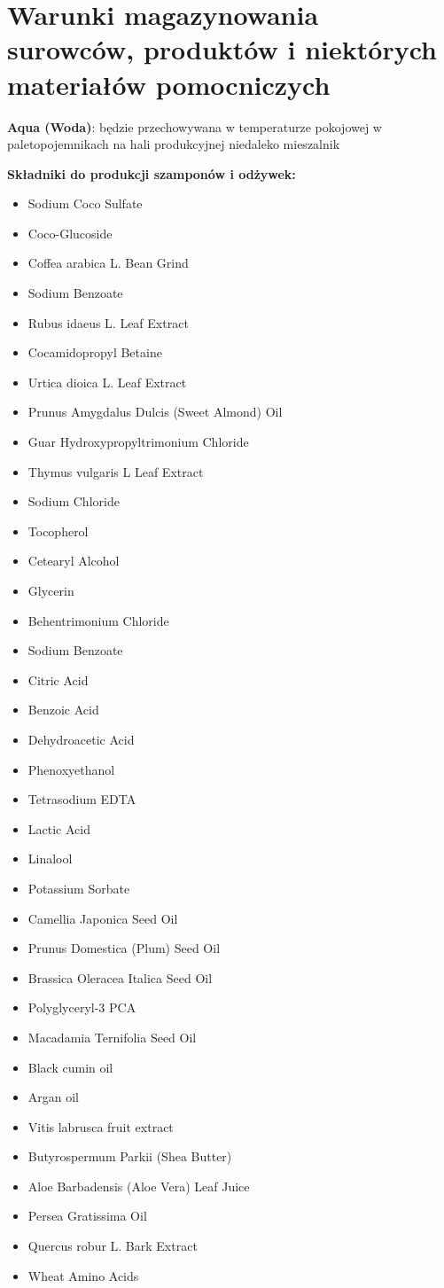 \section{Warunki magazynowania surowców, produktów i niektórych materiałów pomocniczych}

\textbf{Aqua (Woda)}: będzie przechowywana w temperaturze pokojowej w paletopojemnikach na hali produkcyjnej niedaleko mieszalnik\vspace{\baselineskip}

\textbf{Składniki do produkcji szamponów i odżywek:}
\begin{itemize}
	\item Sodium Coco Sulfate
	\item Coco-Glucoside
	\item Coffea arabica L. Bean Grind
	\item Sodium Benzoate
	\item Rubus idaeus L. Leaf Extract
	\item Cocamidopropyl Betaine
	\item Urtica dioica L. Leaf Extract
	\item Prunus Amygdalus Dulcis (Sweet Almond) Oil
	\item Guar Hydroxypropyltrimonium Chloride
	\item Thymus vulgaris L Leaf Extract
	\item Sodium Chloride
	\item Tocopherol
	\item Cetearyl Alcohol
	\item Glycerin
	\item Behentrimonium Chloride
	\item Sodium Benzoate
	\item Citric Acid
	\item Benzoic Acid
	\item Dehydroacetic Acid
	\item Phenoxyethanol
	\item Tetrasodium EDTA
	\item Lactic Acid
	\item Linalool
	\item Potassium Sorbate
	\item Camellia Japonica Seed Oil
	\item Prunus Domestica (Plum) Seed Oil
	\item Brassica Oleracea Italica Seed Oil
	\item Polyglyceryl-3 PCA
	\item Macadamia Ternifolia Seed Oil
	\item Black cumin oil
	\item Argan oil
	\item Vitis labrusca fruit extract
	\item Butyrospermum Parkii (Shea Butter)
	\item Aloe Barbadensis (Aloe Vera) Leaf Juice
	\item Persea Gratissima Oil
	\item Quercus robur L. Bark Extract
	\item Wheat Amino Acids
\end{itemize}

